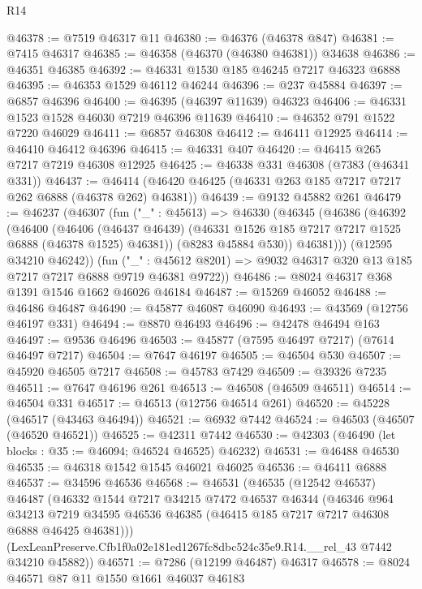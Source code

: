 \begin{lexlean}{R14}
\begin{coremodule}
@46378 := @7519 @46317 @11
@46380 := @46376 (@46378 @847)
@46381 := @7415 @46317
@46385 := @46358 (@46370 (@46380 @46381)) @34638
@46386 := @46351 @46385
@46392 := @46331 @1530 @185 @46245 @7217 @46323 @6888
@46395 := @46353 @1529 @46112 @46244
@46396 := @237 @45884
@46397 := @6857 @46396
@46400 := @46395 (@46397 @11639) @46323
@46406 := @46331 @1523 @1528 @46030 @7219 @46396 @11639
@46410 := @46352 @791 @1522 @7220 @46029
@46411 := @6857 @46308
@46412 := @46411 @12925
@46414 := @46410 @46412 @46396
@46415 := @46331 @407
@46420 := @46415 @265 @7217 @7219 @46308 @12925
@46425 := @46338 @331 @46308 (@7383 (@46341 @331))
@46437 := @46414 (@46420 @46425 (@46331 @263 @185 @7217 @7217 @262 @6888 (@46378 @262) @46381))
@46439 := @9132 @45882 @261
@46479 := @46237
    (@46307
      (fun ("_" : @45613) =>
      @46330
        (@46345
          (@46386
            (@46392
              (@46400
                (@46406
                  (@46437 @46439)
                  (@46331 @1526 @185 @7217 @7217 @1525 @6888 (@46378 @1525) @46381))
                (@8283 @45884 @530))
              @46381)))
        (@12595 @34210 @46242))
      (fun ("_" : @45612 @8201) => @9032 @46317 @320 @13 @185 @7217 @7217 @6888 @9719 @46381 @9722))
@46486 := @8024 @46317 @368 @1391 @1546 @1662 @46026 @46184
@46487 := @15269 @46052
@46488 := @46486 @46487
@46490 := @45877 @46087 @46090
@46493 := @43569 (@12756 @46197 @331)
@46494 := @8870 @46493
@46496 := @42478 @46494 @163
@46497 := @9536 @46496
@46503 := @45877 (@7595 @46497 @7217) (@7614 @46497 @7217)
@46504 := @7647 @46197
@46505 := @46504 @530
@46507 := @45920 @46505 @7217
@46508 := @45783 @7429
@46509 := @39326 @7235
@46511 := @7647 @46196 @261
@46513 := @46508 (@46509 @46511)
@46514 := @46504 @331
@46517 := @46513 (@12756 @46514 @261)
@46520 := @45228 (@46517 (@43463 @46494))
@46521 := @6932 @7442
@46524 := @46503 (@46507 (@46520 @46521))
@46525 := @42311 @7442
@46530 := @42303 (@46490 (let blocks : @35 := @46094; @46524 @46525) @46232)
@46531 := @46488 @46530
@46535 := @46318 @1542 @1545 @46021 @46025
@46536 := @46411 @6888
@46537 := @34596 @46536
@46568 := @46531
    (@46535
      (@12542 @46537)
      @46487
      (@46332
        @1544
        @7217
        @34215
        @7472
        @46537
        @46344
        (@46346
          @964
          @34213
          @7219
          @34595
          @46536
          @46385
          (@46415 @185 @7217 @7217 @46308 @6888 @46425 @46381)))
      (LexLeanPreserve.Cfb1f0a02e181ed1267fc8dbc524c35e9.R14.__rel_43 @7442 @34210 @45882))
@46571 := @7286 (@12199 @46487) @46317
@46578 := @8024 @46571 @87 @11 @1550 @1661 @46037 @46183

\end{coremodule}
\end{lexlean}
